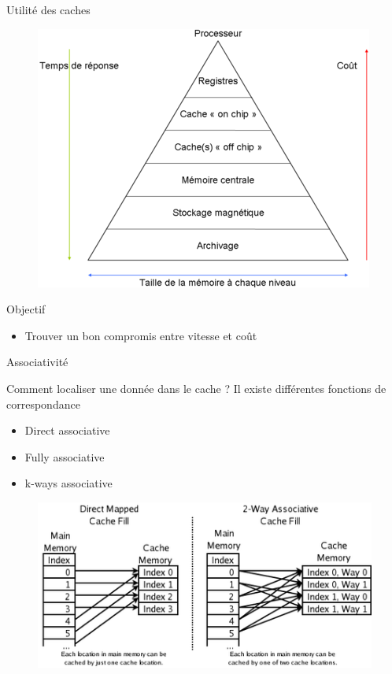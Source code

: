 \begin{frame}{Utilité des caches}
	\begin{figure}[h!]
		\includegraphics[scale=.6]{images/hierarchy.png}
	\end{figure}
	\begin{block}{Objectif}
		\begin{itemize}
			\item{Trouver un bon compromis entre vitesse et coût}
		\end{itemize}
	\end{block}
\end{frame}


\begin{frame}{Associativité}
	\begin{block}{Comment localiser une donnée dans le cache ?}
		Il existe différentes fonctions de correspondance
		\begin{itemize}
			\item{Direct associative}
			\item{Fully associative}
			\item{k-ways associative}
		\end{itemize}
	\end{block}
	\begin{figure}[h!]
		\includegraphics[scale=.4]{images/associative.png}
	\end{figure}
\end{frame}

